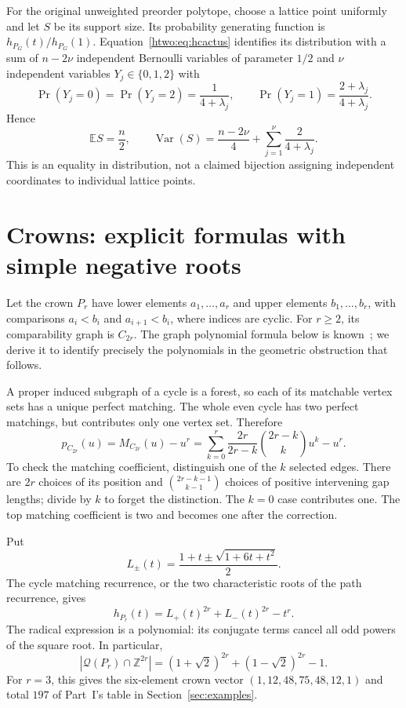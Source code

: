 \documentclass[11pt]{article}
\numberwithin{equation}{section}
\theoremstyle{definition}
\newcommand{\Z}{\mathbb Z}
\begin{document}
For the original unweighted preorder polytope, choose a lattice point
uniformly and let $S$ be its support size. Its probability generating
function is $h_{P_G}(t)/h_{P_G}(1)$. Equation~\eqref{htwo:eq:hcactus} identifies
its distribution with a sum of $n-2\nu$ independent Bernoulli variables
of parameter $1/2$ and $\nu$ independent variables $Y_j\in\{0,1,2\}$ with
\[
 \Pr(Y_j=0)=\Pr(Y_j=2)=\frac1{4+\lambda_j},\qquad
 \Pr(Y_j=1)=\frac{2+\lambda_j}{4+\lambda_j}.
\]
Hence
\begin{equation}
 \mathbb E S=\frac n2,\qquad
 \operatorname{Var}(S)=\frac{n-2\nu}{4}
                         +\sum_{j=1}^{\nu}\frac2{4+\lambda_j}.
 \label{htwo:eq:variance}
\end{equation}
This is an equality in distribution, not a claimed bijection assigning
independent coordinates to individual lattice points.

\section{Crowns: explicit formulas with simple negative roots}\label{htwo:sec:crownroots}

Let the crown $P_r$ have lower elements $a_1,\ldots,a_r$ and upper
elements $b_1,\ldots,b_r$, with comparisons
$a_i<b_i$ and $a_{i+1}<b_i$, where indices are cyclic. For $r\ge2$,
its comparability graph is $C_{2r}$. The graph polynomial formula below
is known~\cite[Corollaries~3.4 and 3.14]{DK}; we derive it to identify
precisely the polynomials in the geometric obstruction that follows.

A proper induced subgraph of a cycle is a forest, so each of its matchable
vertex sets has a unique perfect matching. The whole even cycle has two
perfect matchings, but contributes only one vertex set. Therefore
\begin{equation}
 p_{C_{2r}}(u)=M_{C_{2r}}(u)-u^r
 =\sum_{k=0}^{r}\frac{2r}{2r-k}\binom{2r-k}{k}u^k-u^r.
 \label{htwo:eq:crownpoly}
\end{equation}
To check the matching coefficient, distinguish one of the $k$ selected
edges. There are $2r$ choices of its position and
$\binom{2r-k-1}{k-1}$ choices of positive intervening gap lengths; divide
by $k$ to forget the distinction. The $k=0$ case contributes one.
The top matching coefficient is two and becomes one after the correction.

Put
\[
 L_\pm(t)=\frac{1+t\pm\sqrt{1+6t+t^2}}2.
\]
The cycle matching recurrence, or the two characteristic roots of the
path recurrence, gives
\begin{equation}
 h_{P_r}(t)=L_+(t)^{2r}+L_-(t)^{2r}-t^r.
 \label{htwo:eq:crownh}
\end{equation}
The radical expression is a polynomial: its conjugate terms cancel all
odd powers of the square root. In particular,
\begin{equation}
 |\mathcal Q(P_r)\cap\Z^{2r}|
 =(1+\sqrt2)^{2r}+(1-\sqrt2)^{2r}-1.
 \label{htwo:eq:crownvolume}
\end{equation}
For $r=3$, this gives the six-element crown vector
$(1,12,48,75,48,12,1)$ and total $197$ of Part~I's table in
Section~\ref{sec:examples}.
\end{document}
